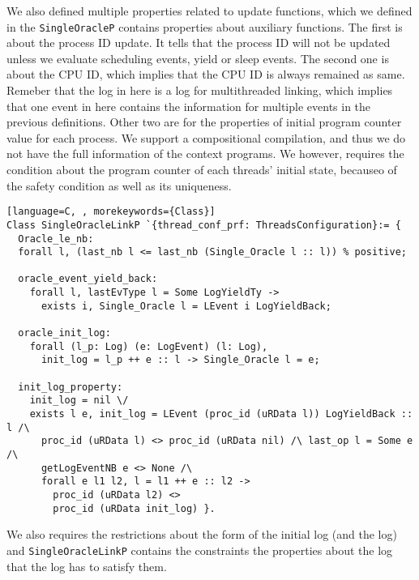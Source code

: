 We also defined multiple properties related to 
update functions, which we defined in the
\lstinline$SingleOracleP$ contains properties about auxiliary functions.
The  first is about the process ID update. 
It tells that the process ID will not be updated unless we evaluate 
scheduling events, yield or sleep events. 
The second one is about the CPU ID, which implies that 
the CPU ID is always remained as same. 
Remeber that the log in here is a log
for multithreaded linking, which implies that 
one event in here contains the information for multiple events in the previous definitions. 
Other two are for the properties of initial program counter value for each 
process.
We support a compositional compilation, and thus 
we do not have the full information of the context programs.
We however, requires the condition about the program counter of each threads' initial state,
becauseo of the safety condition as well as its uniqueness.


\begin{lstlisting}[language=C, , morekeywords={Class}]
Class SingleOracleLinkP `{thread_conf_prf: ThreadsConfiguration}:= {
  Oracle_le_nb: 
  forall l, (last_nb l <= last_nb (Single_Oracle l :: l)) % positive;

  oracle_event_yield_back:
    forall l, lastEvType l = Some LogYieldTy ->
      exists i, Single_Oracle l = LEvent i LogYieldBack;

  oracle_init_log:
    forall (l_p: Log) (e: LogEvent) (l: Log),
      init_log = l_p ++ e :: l -> Single_Oracle l = e;
      
  init_log_property:
    init_log = nil \/
    exists l e, init_log = LEvent (proc_id (uRData l)) LogYieldBack :: l /\
      proc_id (uRData l) <> proc_id (uRData nil) /\ last_op l = Some e /\
      getLogEventNB e <> None /\
      forall e l1 l2, l = l1 ++ e :: l2 ->
        proc_id (uRData l2) <> 
        proc_id (uRData init_log) }.
\end{lstlisting}

We also requires the restrictions about the form of the initial log (and the log) 
and \lstinline$SingleOracleLinkP$  contains the constraints
the properties about the log that 
the log has to  satisfy them. 
